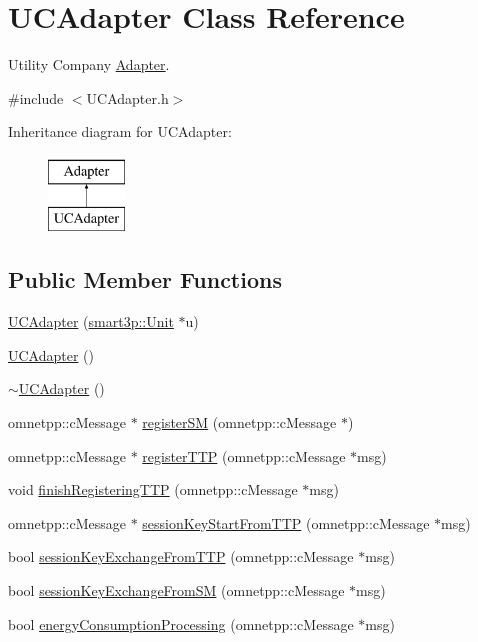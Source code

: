 \hypertarget{classUCAdapter}{}\section{U\+C\+Adapter Class Reference}
\label{classUCAdapter}


Utility Company \hyperlink{classAdapter}{Adapter}.  




{\ttfamily \#include $<$U\+C\+Adapter.\+h$>$}

Inheritance diagram for U\+C\+Adapter\+:\begin{figure}[H]
\begin{center}
\leavevmode
\includegraphics[height=2.000000cm]{classUCAdapter}
\end{center}
\end{figure}
\subsection*{Public Member Functions}
\begin{DoxyCompactItemize}
\item 
\hyperlink{classUCAdapter_ad845819dddba8f4dd674425ff320d99b}{U\+C\+Adapter} (\hyperlink{classsmart3p_1_1Unit}{smart3p\+::\+Unit} $\ast$u)
\item 
\hyperlink{classUCAdapter_a15c10a1542ab5729b6663c342a71e217}{U\+C\+Adapter} ()
\item 
\hyperlink{classUCAdapter_a5d43145233b8a18e92d258aef1d65426}{$\sim$\+U\+C\+Adapter} ()
\item 
omnetpp\+::c\+Message $\ast$ \hyperlink{classUCAdapter_a04ad687c0afed4f04b146742a7bd015f}{register\+SM} (omnetpp\+::c\+Message $\ast$)
\item 
omnetpp\+::c\+Message $\ast$ \hyperlink{classUCAdapter_af76f6694150b1cff5ee307851a501159}{register\+T\+TP} (omnetpp\+::c\+Message $\ast$msg)
\item 
void \hyperlink{classUCAdapter_ab66ce1ddf0945e8d3af7a9e5bf47b411}{finish\+Registering\+T\+TP} (omnetpp\+::c\+Message $\ast$msg)
\item 
omnetpp\+::c\+Message $\ast$ \hyperlink{classUCAdapter_a5d19454ec8881addda7d1f144cae56eb}{session\+Key\+Start\+From\+T\+TP} (omnetpp\+::c\+Message $\ast$msg)
\item 
bool \hyperlink{classUCAdapter_a98ef8576af7f724b687edcf2dc7c3221}{session\+Key\+Exchange\+From\+T\+TP} (omnetpp\+::c\+Message $\ast$msg)
\item 
bool \hyperlink{classUCAdapter_a855d4b0354b46575b99e1c46b746e5ac}{session\+Key\+Exchange\+From\+SM} (omnetpp\+::c\+Message $\ast$msg)
\item 
bool \hyperlink{classUCAdapter_a6554ae131e5cf6c059158061eb629839}{energy\+Consumption\+Processing} (omnetpp\+::c\+Message $\ast$msg)
\end{DoxyCompactItemize}

